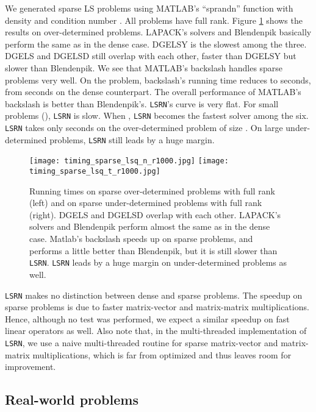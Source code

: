\documentclass{siamltex}
\begin{document}
We generated sparse LS problems using MATLAB's ``sprandn'' function with density
 and condition number . All problems have full rank. Figure
\ref{fig:timing_sparse_full_rank} shows the results on over-determined
problems. LAPACK's solvers and Blendenpik basically perform the same as in the
dense case. DGELSY is the slowest among the three. DGELS and DGELSD still
overlap with each other, faster than DGELSY but slower than Blendenpik. We see
that MATLAB's backslash handles sparse problems very well. On the  problem, backslash's running time reduces to  seconds, from 
seconds on the dense counterpart. The overall performance of MATLAB's backslash
is better than Blendenpik's. \texttt{LSRN}'s curve is very flat. For small
problems (), \texttt{LSRN} is slow. When , \texttt{LSRN}
becomes the fastest solver among the six. \texttt{LSRN} takes only  seconds
on the over-determined problem of size . On large
under-determined problems, \texttt{LSRN} still leads by a huge margin.
\begin{figure}
  \centering
  \texttt{[image: timing\_sparse\_lsq\_n\_r1000.jpg]}
  \texttt{[image: timing\_sparse\_lsq\_t\_r1000.jpg]}
  \caption{Running times on  sparse over-determined problems with
    full rank (left) and on  sparse under-determined problems
    with full rank (right). DGELS and DGELSD overlap with each other. LAPACK's
    solvers and Blendenpik perform almost the same as in the dense
    case. {\sc Matlab}'s backslash speeds up on sparse problems, and performs a
    little better than Blendenpik, but it is still slower than
    \texttt{LSRN}. \texttt{LSRN} leads by a huge margin on under-determined
    problems as well.}
  \label{fig:timing_sparse_full_rank}
\end{figure}

\texttt{LSRN} makes no distinction between dense and sparse problems.  The
speedup on sparse problems is due to faster matrix-vector and matrix-matrix
multiplications.  Hence, although no test was performed, we expect a similar
speedup on fast linear operators as well.  Also note that, in the multi-threaded
implementation of \texttt{LSRN}, we use a naive multi-threaded routine for
sparse matrix-vector and matrix-matrix multiplications, which is far from
optimized and thus leaves room for improvement.

\subsection{Real-world problems}
\label{sec:real-world-prob}
\end{document}
